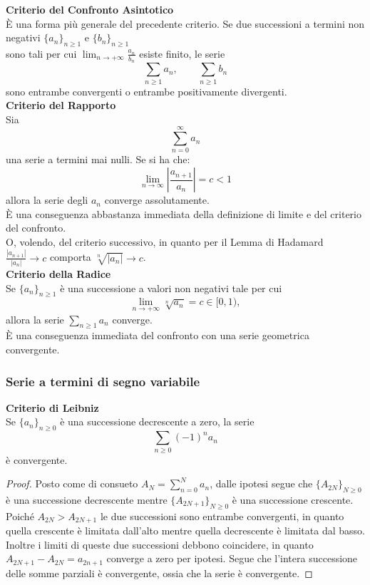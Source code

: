 \documentclass[a4paper,twoside]{article}
\theoremstyle{definition}
\numberwithin{theorem}{section}
\begin{document}
\textbf{Criterio del Confronto Asintotico} \\
È una forma più generale del precedente criterio. Se due successioni a termini non negativi $\{a_n\}_{n\geq 1}$ e $\{b_n\}_{n\geq 1}$ \\sono tali per cui $\lim_{n\to+\infty}\frac{a_n}{b_n}$ esiste finito, le serie 
$$ \sum_{n\geq 1} a_n,\qquad \sum_{n\geq 1} b_n $$
sono entrambe convergenti o entrambe positivamente divergenti.\\

\textbf{Criterio del Rapporto} \\
Sia
$$\sum_{n=0}^{\infty}a_n$$
una serie a termini mai nulli. Se si ha che:
$$\lim_{n\to\infty} \left|\frac{a_{n+1}}{a_n}\right|=c<1$$
allora la serie degli $a_n$ converge assolutamente.\\
È una conseguenza abbastanza immediata della definizione di limite e del criterio del confronto.\\ O, volendo, del criterio successivo, in quanto per il Lemma di Hadamard $\frac{|a_{n+1}|}{|a_n|}\to c$ comporta $\sqrt[n]{|a_n|}\to c$.\\

\textbf{Criterio della Radice} \\
Se $\{a_n\}_{n\geq 1}$ è una successione a valori non negativi tale per cui
$$ \lim_{n\to +\infty}\sqrt[n]{a_n} = c \in [0,1), $$
allora la serie $\sum_{n\geq 1}a_n$ converge.\\
È una conseguenza immediata del confronto con una serie geometrica convergente.

\subsubsection{Serie a termini di segno variabile}

\textbf{Criterio di Leibniz}\\
Se $\{a_n\}_{n\geq 0}$ è una successione decrescente a zero, la serie
$$ \sum_{n\geq 0} (-1)^n a_n $$
è convergente.\\
\begin{proof} Posto come di consueto $A_N=\sum_{n=0}^{N}a_n$, dalle ipotesi segue che $\{A_{2N}\}_{N\geq 0}$ è una successione decrescente mentre $\{A_{2N+1}\}_{N\geq 0}$ è una successione crescente. Poiché $A_{2N} > A_{2N+1}$ le due successioni sono entrambe convergenti, in quanto quella crescente è limitata dall'alto mentre quella decrescente è limitata dal basso. Inoltre i limiti di queste due successioni debbono coincidere, in quanto $A_{2N+1}-A_{2N}=a_{2n+1}$ converge a zero per ipotesi. Segue che l'intera successione delle somme parziali è convergente, ossia che la serie è convergente. 
\end{proof}
\end{document}
